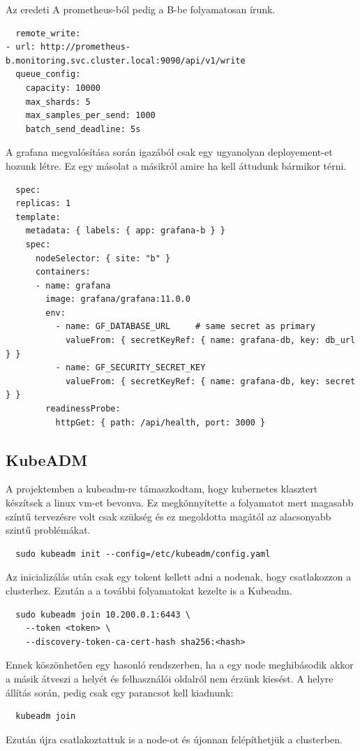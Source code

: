 Az eredeti A prometheus-ból pedig a B-be folyamatosan írunk.

\begin{lstlisting}
  remote_write:
- url: http://prometheus-b.monitoring.svc.cluster.local:9090/api/v1/write
  queue_config:
    capacity: 10000
    max_shards: 5
    max_samples_per_send: 1000
    batch_send_deadline: 5s
\end{lstlisting}

A grafana megvalósítása során igazából csak egy ugyanolyan deployement-et hozunk létre.
Ez egy másolat a másikról amire ha kell áttudunk bármikor térni.

\begin{lstlisting}
  spec:
  replicas: 1
  template:
    metadata: { labels: { app: grafana-b } }
    spec:
      nodeSelector: { site: "b" }
      containers:
      - name: grafana
        image: grafana/grafana:11.0.0
        env:
          - name: GF_DATABASE_URL     # same secret as primary
            valueFrom: { secretKeyRef: { name: grafana-db, key: db_url } }
          - name: GF_SECURITY_SECRET_KEY
            valueFrom: { secretKeyRef: { name: grafana-db, key: secret } }
        readinessProbe:
          httpGet: { path: /api/health, port: 3000 }
\end{lstlisting}

\subsection{KubeADM}

A projektemben a kubeadm-re támaszkodtam, hogy kubernetes klasztert készítsek a linux vm-et bevonva. 
Ez megkönnyítette a folyamatot mert magasabb színtű tervezésre volt csak szükség és ez megoldotta magától 
az alacsonyabb szintű problémákat.

\begin{lstlisting}
  sudo kubeadm init --config=/etc/kubeadm/config.yaml
\end{lstlisting}

Az inicializálás után csak egy tokent kellett adni a nodenak, hogy csatlakozzon a clusterhez.
Ezután a a további folyamatokat kezelte is a Kubeadm.

\begin{lstlisting}
  sudo kubeadm join 10.200.0.1:6443 \
    --token <token> \
    --discovery-token-ca-cert-hash sha256:<hash>
\end{lstlisting}

Ennek köszönhetően egy hasonló rendszerben, ha a egy node meghibásodik akkor a másik átveszi a helyét és felhasználói oldalról
nem érzünk kiesést. A helyre állítás során, pedig csak egy parancsot kell kiadnunk:

\begin{lstlisting}
  kubeadm join
\end{lstlisting}

Ezután újra csatlakoztattuk is a node-ot és újonnan felépíthetjük a clusterben.